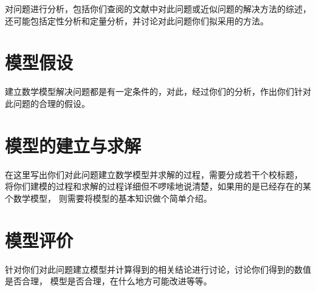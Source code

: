 \documentclass[a4paper, UTF8]{article}
\begin{document}
        对问题进行分析，包括你们查阅的文献中对此问题或近似问题的解决方法的综述，
        还可能包括定性分析和定量分析，并讨论对此问题你们拟采用的方法。
	
    \section{模型假设}

        建立数学模型解决问题都是有一定条件的，对此，经过你们的分析，作出你们针对此问题的合理的假设。
	
	\section{模型的建立与求解}
    
        在这里写出你们对此问题建立数学模型并求解的过程，需要分成若干个校标题，
        将你们建模的过程和求解的过程详细但不啰嗦地说清楚，如果用的是已经存在的某个数学模型，
        则需要将模型的基本知识做个简单介绍。

    \section{模型评价}
    
        针对你们对此问题建立模型并计算得到的相关结论进行讨论，讨论你们得到的数值是否合理，
        模型是否合理，在什么地方可能改进等等。
	
\end{document}
